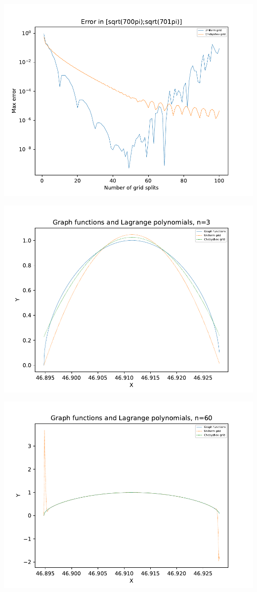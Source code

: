 \includegraphics[scale=0.75]{6.pdf}

\includegraphics[scale=0.75]{7.pdf}

\includegraphics[scale=0.75]{8.pdf}

